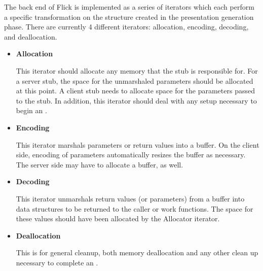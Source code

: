 

The back end of Flick is implemented as a series of iterators which each
perform a specific transformation on the \PRESC{} structure created in the
presentation generation phase.  There are currently 4 different iterators:
allocation, encoding, decoding, and deallocation.

\begin{itemize}
  \item \textbf{Allocation}

  This iterator should allocate any memory that the stub is responsible for.
  For a server stub, the space for the unmarshaled parameters should be
  allocated at this point.  A client stub needs to allocate space for the
  parameters passed to the stub.  In addition, this iterator should deal with
  any setup necessary to begin an \RPC{}\@.

  \item \textbf{Encoding}

  This iterator marshals parameters or return values into a buffer.  On the
  client side, encoding of parameters automatically resizes the buffer as
  necessary.  The server side may have to allocate a buffer, as well.

  \item \textbf{Decoding}

  This iterator unmarshals return values (or parameters) from a buffer into
  data structures to be returned to the caller or work functions.  The space
  for these values should have been allocated by the Allocator iterator.

  \item \textbf{Deallocation}

  This is for general cleanup, both memory deallocation and any other clean up
  necessary to complete an \RPC{}.
\end{itemize}

